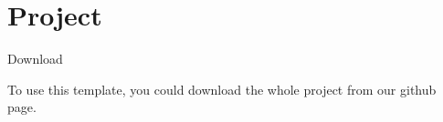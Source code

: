 \documentclass[pdf]{beamer}
\begin{document}
\section{Project}

\begin{frame}{Download}

    To use this template, you could download the whole project from
    our github page.
    \hyperlink{https://github.com/liangchenn/NTU-Beamer}{}%
    \\
    \hyperlink{https://github.com/liangchenn/NTU-Beamer}{\faGithub}
    
\end{frame}
\end{document}
